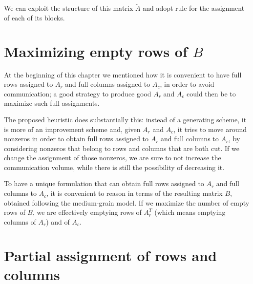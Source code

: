 We can exploit the structure of this matrix $\tilde{A}$ and adopt rule for the assignment of each of its blocks.

\section{Maximizing empty rows of $B$} \label{sec:globalview}

At the beginning of this chapter we mentioned how it is convenient to have full rows assigned to $A_r$ and full columns assigned to $A_c$, in order to avoid communication; a good strategy to produce good $A_r$ and $A_c$ could then be to maximize such full assignments.

The proposed heuristic does substantially this: instead of a generating scheme, it is more of an improvement scheme and, given $A_r$ and $A_c$, it tries to move around nonzeros in order to obtain full rows assigned to $A_r$ and full columns to $A_c$, by considering nonzeros that belong to rows and columns that are both cut. If we change the assignment of those nonzeros, we are sure to not increase the communication volume, while there is still the possibility of decreasing it. 

To have a unique formulation that can obtain full rows assigned to $A_r$ and full columns to $A_c$, it is convenient to reason in terms of the resulting matrix $B$, obtained following the medium-grain model. If we maximize the number of empty rows of $B$, we are effectively emptying rows of $A_r^T$ (which means emptying columns of $A_r$) and of $A_c$. 

\section{Partial assignment of rows and columns} \label{sec:hot_restart}
